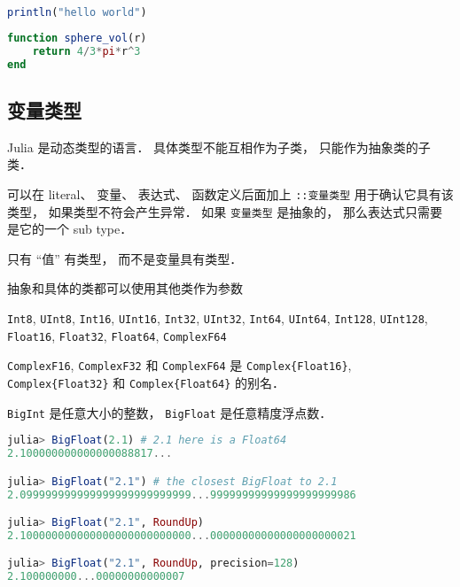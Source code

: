 
\begin{issues}
\issueDraft
\end{issues}

\begin{lstlisting}[language=julia]
println("hello world")
\end{lstlisting}

\begin{lstlisting}[language=julia]
function sphere_vol(r)
    return 4/3*pi*r^3
end
\end{lstlisting}

\subsection{变量类型}



Julia 是动态类型的语言． 具体类型不能互相作为子类， 只能作为抽象类的子类．

可以在 literal、 变量、 表达式、 函数定义后面加上 \verb|::变量类型| 用于确认它具有该类型， 如果类型不符会产生异常． 如果 \verb|变量类型| 是抽象的， 那么表达式只需要是它的一个 sub type．

只有 “值” 有类型， 而不是变量具有类型．

抽象和具体的类都可以使用其他类作为参数

\verb|Int8|, \verb|UInt8|, \verb|Int16|, \verb|UInt16|, \verb|Int32|, \verb|UInt32|, \verb|Int64|, \verb|UInt64|, \verb|Int128|, \verb|UInt128|, \verb|Float16|, \verb|Float32|, \verb|Float64|, \verb|ComplexF64|

\verb|ComplexF16|, \verb|ComplexF32| 和 \verb|ComplexF64| 是 \verb|Complex{Float16}|, \verb|Complex{Float32}| 和 \verb|Complex{Float64}| 的别名．

\verb|BigInt| 是任意大小的整数， \verb|BigFloat| 是任意精度浮点数．

\begin{lstlisting}[language=julia]
julia> BigFloat(2.1) # 2.1 here is a Float64
2.100000000000000088817...

julia> BigFloat("2.1") # the closest BigFloat to 2.1
2.099999999999999999999999999...99999999999999999999986

julia> BigFloat("2.1", RoundUp)
2.100000000000000000000000000...00000000000000000000021

julia> BigFloat("2.1", RoundUp, precision=128)
2.100000000...00000000000007
\end{lstlisting}

